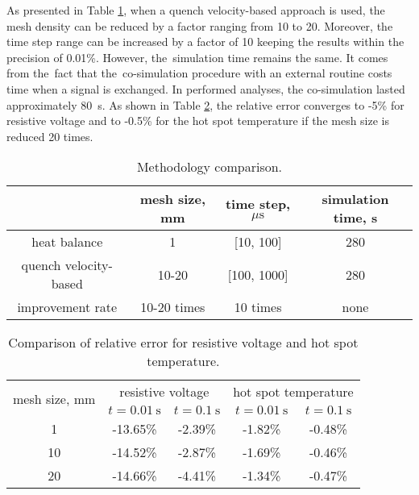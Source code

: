 As presented in Table \ref{table: 1d_qv_benchmarking_no_insulation_methods_comparison}, when a quench velocity-based approach is used, the mesh density can be reduced by a factor ranging from 10 to 20. Moreover, the time step range can be increased by a factor of 10 keeping the results within the precision of 0.01\%. However, the~simulation time remains the same. It comes from the~fact that the~co-simulation procedure with an external routine costs time when a signal is exchanged. In performed analyses, the co-simulation lasted approximately 80~s. As shown in Table \ref{table: 1d_qv_benchmarking_no_insulation_res_and_hot_spot_error_conclusion}, the relative error converges to -5\% for resistive voltage and to -0.5\% for the hot spot temperature if the mesh size is reduced 20 times.

\begin{table}[H]
    \caption{Methodology comparison.} 
    \vspace{-1.em} 
    \fontsize{10}{10}
    \selectfont 
    \renewcommand{\arraystretch}{1.5}
    \begin{center}
        \begin{tabular}{ cccc }  
        \hline
          & mesh size, mm & time step, $\mu \text{s}$ & simulation time, s\\
        \hline
        heat balance & 1 & [10, 100] & 280 \\
        quench velocity-based & 10-20 & [100, 1000] & 280 \\
        \hline 
        improvement rate & 10-20 times & 10 times & none\\
        \end{tabular}
    \end{center}  
     \label{table: 1d_qv_benchmarking_no_insulation_methods_comparison} 
 \end{table}
 
 \begin{table}[H]
    \caption{Comparison of relative error for resistive voltage and hot spot temperature.} 
    \vspace{-1.em} 
    \fontsize{10}{10}
    \selectfont 
    \renewcommand{\arraystretch}{1.5}
    \begin{center}
        \begin{tabular}{ c | cc | cc }  
        \hline
        \multirow{2}{*}{mesh size, mm} & \multicolumn{2}{c|}{resistive voltage} & \multicolumn{2}{c}{hot spot temperature} \\ 
           & $t=0.01~\text{s}$ & $t=0.1~\text{s}$ & $t=0.01~\text{s}$ & $t=0.1~\text{s}$ \\
        \hline
        1 & -13.65\% & -2.39\% & -1.82\% & -0.48\% \\
        10 & -14.52\% & -2.87\% & -1.69\% & -0.46\% \\
        20 & -14.66\% & -4.41\% & -1.34\% & -0.47\% \\
        \hline 
        \end{tabular}
    \end{center}  
     \label{table: 1d_qv_benchmarking_no_insulation_res_and_hot_spot_error_conclusion} 
 \end{table}
